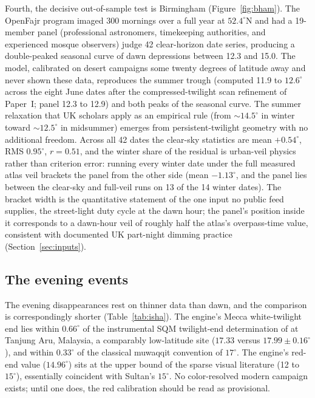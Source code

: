 \documentclass[preprint,12pt]{elsarticle}
\begin{document}
Fourth, the decisive out-of-sample test is Birmingham
(Figure~\ref{fig:bham}). The OpenFajr
program \citep{openfajr2016} imaged 300 mornings over a full year at
$52.4^\circ$N and had a 19-member panel (professional astronomers,
timekeeping authorities, and experienced mosque observers) judge 42
clear-horizon date series, producing a double-peaked seasonal curve of
dawn depressions between 12.3 and 15.0. The model, calibrated on desert
campaigns some twenty degrees of latitude away and never shown these
data, reproduces the summer
trough (computed 11.9 to $12.6^\circ$ across the eight June dates
after the compressed-twilight scan refinement of Paper~I; panel 12.3
to 12.9) and both peaks of the seasonal curve. The summer relaxation
that UK scholars apply as an empirical rule (from $\sim 14.5^\circ$ in
winter toward $\sim 12.5^\circ$ in midsummer) emerges from
persistent-twilight geometry with no additional freedom. Across all
42 dates the clear-sky statistics are mean $+0.54^\circ$, RMS
$0.95^\circ$, $r = 0.51$, and the winter share of the residual is
urban-veil physics rather than criterion error: running every winter
date under the full measured atlas veil brackets the panel from the
other side (mean $-1.13^\circ$, and the panel lies between the
clear-sky and full-veil runs on 13 of the 14 winter dates). The
bracket width is the quantitative statement of the one input no
public feed supplies, the street-light duty cycle at the dawn hour;
the panel's position inside it corresponds to a dawn-hour veil of
roughly half the atlas's overpass-time value, consistent with
documented UK part-night dimming practice
(Section~\ref{sec:inputs}).

\subsection{The evening events}
\label{sec:isha}

The evening disappearances rest on thinner data than dawn, and the
comparison is correspondingly shorter (Table~\ref{tab:isha}). The
engine's Mecca white-twilight end lies within $0.66^{\circ}$ of the
instrumental SQM twilight-end determination of \citet{niri2012} at
Tanjung Aru, Malaysia, a comparably low-latitude site ($17.33$ versus
$17.99 \pm 0.16^{\circ}$), and within $0.33^{\circ}$ of the
classical muwaqqit convention of $17^{\circ}$. The engine's red-end value ($14.96^{\circ}$) sits at the
upper bound of the sparse visual literature (12
to $15^{\circ}$), essentially coincident with Sultan's $15^{\circ}$. No
color-resolved modern
campaign exists; until one does, the red calibration should be read
as provisional.
\end{document}
